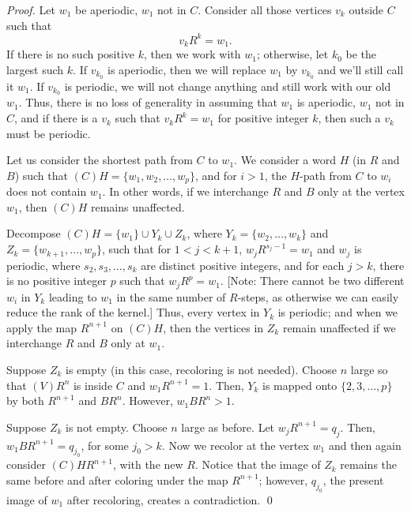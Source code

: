\begin{proof}
\vphantom{...}

Let $w_1$ be aperiodic, $w_1$ not in $C$.
Consider all those vertices $v_k$ outside $C$ such that 
\[
  v_kR^k =w_1.
\]
If there is no such positive $k$, then we work with $w_1$; otherwise, let
$k_0$ be the largest such $k$. 
If $v_{k_0}$ is aperiodic, then we will replace $w_1$ by $v_{k_0}$ and we'll still call it $w_1$. 
If $v_{k_0}$ is periodic, we will not change anything and still work with our old $w_1$. 
Thus, there is no loss of generality in assuming that $w_1$ is aperiodic, $w_1$ not in $C$, and if there is a $v_k$ such that $v_kR^k=w_1$ for positive integer $k$, then such a $v_k$ must be periodic.

\vphantom{...}

Let us consider the shortest path from $C$ to $w_1$. 
We consider a word $H$ (in $R$ and $B$) such that $(C)H=\{w_1,w_2,\dots,w_p\}$, and for $i>1$, the $H$-path from $C$ to $w_i$ does not contain $w_1$. In other words, if we interchange $R$ and $B$ only at the vertex $w_1$, then $(C)H$ remains unaffected.

\vphantom{...}

Decompose $(C)H=\{w_1\}\cup Y_k\cup Z_k$, where $Y_k=\{w_2,\dots,w_k\}$ and
$Z_k=\{w_{k+1},\dots,w_p\}$, such that for $1<j<k+1$, $w_jR^{s_j-1}=w_1$ and
$w_j$ is periodic, where $s_2,s_3,\dots,s_k$ are distinct positive integers, and for each $j>k$, there is no positive integer $p$ such that
$w_jR^p=w_1$. 
[Note: There cannot be two different $w_i$ in $Y_k$ leading to $w_1$ in the same number of $R$-steps, as otherwise we can easily reduce the rank of the kernel.] 
Thus, every vertex in $Y_k$ is periodic; and when we apply the map $R^{n+1}$ on $(C)H$, then the vertices in $Z_k$ remain unaffected if we interchange $R$ and $B$ only at $w_1$.


Suppose $Z_k$ is empty (in this case, recoloring is not needed). 
Choose $n$ large so that $(V)R^n$ is inside $C$ and $w_1R^{n+1}=1$. 
Then, $Y_k$ is mapped onto $\{2,3,\dots,p\}$ by both $R^{n+1}$ and $BR^n$. 
However, $w_1BR^n>1$.

Suppose $Z_k$ is not empty. 
Choose $n$ large as before. 
Let $w_jR^{n+1}=q_j$. Then, $w_1BR^{n+1}=q_{j_0}$, for some $j_0>k$. 
Now we recolor at the vertex $w_1$ and then again consider $(C)HR^{n+1}$, with the new $R$. 
Notice that the image of $Z_k$ remains  the same before and after coloring under the map $R^{n+1}$; however, $q_{j_0}$, the present image of $w_1$ after recoloring, creates a contradiction.
\qed
\end{proof}

